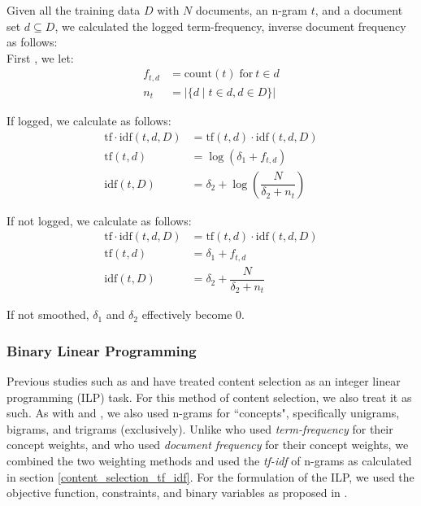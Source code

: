     Given all the training data $D$ with $N$ documents, an n-gram $t$, and a document set $d\subseteq D$, we calculated the logged term-frequency, inverse document frequency as follows: \\

    First , we let:
    \begin{align}
        f_{t,d} &= \mathrm{count}(t) \; \mathrm{for} \: t\in d \\
        n_t &= \vert \{d\mid t\in d, d\in D\}\vert
    \end{align}        

    If logged, we calculate as follows:    
    \begin{align}
        \mathrm{tf}\cdot \mathrm{idf}(t,d,D) 
            &= \mathrm{tf}(t,d)\cdot \mathrm{idf}(t,d,D) \\
        \mathrm{tf}(t,d) 
            &= \log(\delta_1 + f_{t,d})\\
        \mathrm{idf}(t,D) 
            &= \delta_2 + \log\left(\dfrac{N}{\delta_2 + n_{t}}\right)
    \end{align}
    
    If not logged, we calculate as follows:
        \begin{align}
            \mathrm{tf}\cdot \mathrm{idf}(t,d,D)
                &= \mathrm{tf}(t,d)\cdot \mathrm{idf}(t,d,D) \\
                \mathrm{tf}(t,d)
                &= \delta_1 + f_{t,d}\\
             \mathrm{idf}(t,D) 
                &= \delta_2 + \dfrac{N}{\delta_2 + n_{t}} 
        \end{align}

    If not smoothed, $\delta_1$ and $\delta_2$ effectively become $0$.

\subsubsection{Binary Linear Programming}
Previous studies such as \citet{Gillick_2008_ILP} and \citet{luo_liu_liu_litman_2018} have treated content selection as an integer linear programming (ILP) task. For this method of content selection, we also treat it as such. As with \citet{Gillick_2008_ILP} and \citet{luo_liu_liu_litman_2018}, we also used n-grams for ``concepts", specifically unigrams, bigrams, and trigrams (exclusively). Unlike \citet{luo_liu_liu_litman_2018} who used \textit{term-frequency} for their concept weights, and \citet{Gillick_2008_ILP} who used \textit{document frequency} for their concept weights, we combined the two weighting methods and used the \textit{tf-idf} of n-grams as calculated in section \ref{content_selection_tf_idf}. For the formulation of the ILP, we used the objective function, constraints, and binary variables as proposed in \citet{Gillick_2008_ILP}. 

